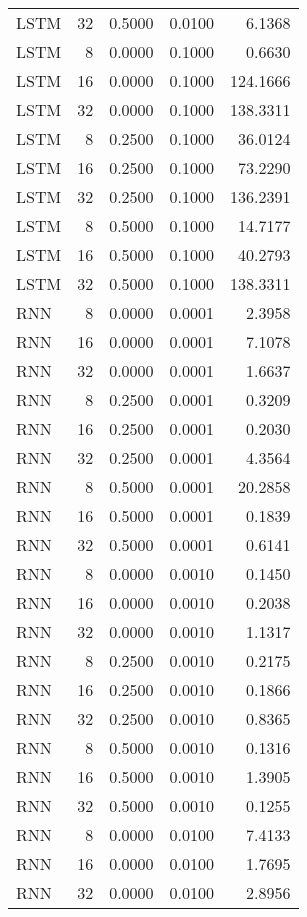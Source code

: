 \begin{table}[h!]
\begin{adjustbox}{max width=\textwidth}
\begin{tabular}{lrrrr}
  LSTM &    32 & 0.5000 & 0.0100 & 6.1368 \\ 
  LSTM &     8 & 0.0000 & 0.1000 & 0.6630 \\ 
  LSTM &    16 & 0.0000 & 0.1000 & 124.1666 \\ 
  LSTM &    32 & 0.0000 & 0.1000 & 138.3311 \\ 
  LSTM &     8 & 0.2500 & 0.1000 & 36.0124 \\ 
  LSTM &    16 & 0.2500 & 0.1000 & 73.2290 \\ 
  LSTM &    32 & 0.2500 & 0.1000 & 136.2391 \\ 
  LSTM &     8 & 0.5000 & 0.1000 & 14.7177 \\ 
  LSTM &    16 & 0.5000 & 0.1000 & 40.2793 \\ 
  LSTM &    32 & 0.5000 & 0.1000 & 138.3311 \\ 
  RNN &     8 & 0.0000 & 0.0001 & 2.3958 \\ 
  RNN &    16 & 0.0000 & 0.0001 & 7.1078 \\ 
  RNN &    32 & 0.0000 & 0.0001 & 1.6637 \\ 
  RNN &     8 & 0.2500 & 0.0001 & 0.3209 \\ 
  RNN &    16 & 0.2500 & 0.0001 & 0.2030 \\ 
  RNN &    32 & 0.2500 & 0.0001 & 4.3564 \\ 
  RNN &     8 & 0.5000 & 0.0001 & 20.2858 \\ 
  RNN &    16 & 0.5000 & 0.0001 & 0.1839 \\ 
  RNN &    32 & 0.5000 & 0.0001 & 0.6141 \\ 
  RNN &     8 & 0.0000 & 0.0010 & 0.1450 \\ 
  RNN &    16 & 0.0000 & 0.0010 & 0.2038 \\ 
  RNN &    32 & 0.0000 & 0.0010 & 1.1317 \\ 
  RNN &     8 & 0.2500 & 0.0010 & 0.2175 \\ 
  RNN &    16 & 0.2500 & 0.0010 & 0.1866 \\ 
  RNN &    32 & 0.2500 & 0.0010 & 0.8365 \\ 
  RNN &     8 & 0.5000 & 0.0010 & 0.1316 \\ 
  RNN &    16 & 0.5000 & 0.0010 & 1.3905 \\ 
  RNN &    32 & 0.5000 & 0.0010 & 0.1255 \\ 
  RNN &     8 & 0.0000 & 0.0100 & 7.4133 \\ 
  RNN &    16 & 0.0000 & 0.0100 & 1.7695 \\ 
  RNN &    32 & 0.0000 & 0.0100 & 2.8956 \\ 

\end{tabular}
\end{adjustbox}
\end{table}
